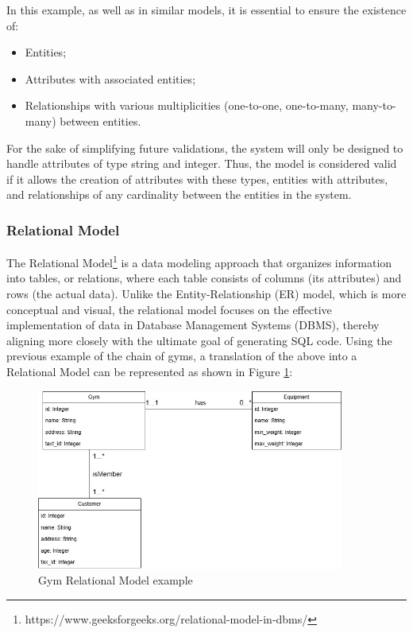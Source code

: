 \documentclass[10pt]{article}
\begin{document}
In this example, as well as in similar models, it is essential to ensure the existence of:

\begin{itemize}
    \item Entities;
    \item Attributes with associated entities;
    \item Relationships with various multiplicities (one-to-one, one-to-many, many-to-many) between entities.
\end{itemize}

For the sake of simplifying future validations, the system will only be designed to handle attributes of type string and integer. Thus, the model is considered valid if it allows the creation of attributes with these types, entities with attributes, and relationships of any cardinality between the entities in the system.

\subsubsection{Relational Model}

The Relational Model\footnote{https://www.geeksforgeeks.org/relational-model-in-dbms/} is a data modeling approach that organizes information into tables, or relations, where each table consists of columns (its attributes) and rows (the actual data). Unlike the Entity-Relationship (ER) model, which is more conceptual and visual, the relational model focuses on the effective implementation of data in Database Management Systems (DBMS), thereby aligning more closely with the ultimate goal of generating SQL code. Using the previous example of the chain of gyms, a translation of the above into a Relational Model can be represented as shown in Figure \ref{figure2}:

\begin{center}
    \begin{figure}[H]
        \centering
        \includegraphics[width=0.9\textwidth]{imgs/relational-model.png}
            \caption{Gym Relational Model example}
        \label{figure2}
    \end{figure}
\end{center}
\end{document}
